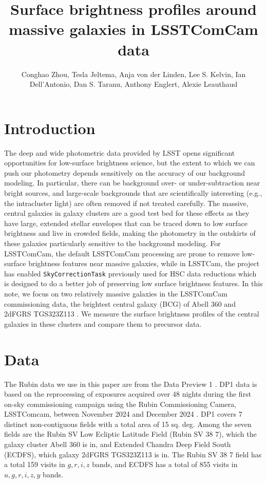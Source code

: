 \documentclass[SE, authoryear,toc]{lsstdoc}
\title{Surface brightness profiles around massive galaxies in LSSTComCam data}
\date{\vcsDate}
\begin{document}
\author{Conghao Zhou, Tesla Jeltema, Anja von der Linden, Lee S. Kelvin, Ian Dell’Antonio, Dan S. Taranu, Anthony Englert, Alexie Leauthaud}

\maketitle


\section{Introduction}
The deep and wide photometric data provided by LSST opens significant opportunities for low-surface brightness science, but the extent to which we can push our photometry depends sensitively on the accuracy of our background modeling. In particular, there can be background over- or under-subtraction near bright sources, and large-scale backgrounds that are scientifically interesting (e.g., the intracluster light) are often removed if not treated carefully. The massive, central galaxies in galaxy clusters are a good test bed for these effects as they have large, extended stellar envelopes that can be traced down to low surface brightness and live in crowded fields, making the photometry in the outskirts of these galaxies particularly sensitive to the background modeling. For LSSTComCam, the default LSSTComCam processing are prone to remove low-surface brightness features near massive galaxies, while in LSSTCam, the project has enabled \texttt{SkyCorrectionTask}  previously used for HSC data reductions which is designed to do a better job of preserving low surface brightness features. In this note, we focus on two relatively massive galaxies in the LSSTComCam commissioning data, the brightest central galaxy (BCG) of Abell 360 and 2dFGRS TGS323Z113 . We measure the surface brightness profiles of the central galaxies in these clusters and compare them to precursor data.

\section{Data}
The Rubin data we use in this paper are from the Data Preview 1 \citep[DP1;][]{RTN-095}. DP1 data is based on the reprocessing of exposures acquired over 48 nights during the first on-sky commissioning campaign using the Rubin Commissioning Camera, LSSTComcam, between November 2024 and December 2024 \citep{10.71929/RUBIN/2561361}. DP1 covers 7 distinct non-contiguous fields with a total area of 15 sq. deg. Among the seven fields are the Rubin SV Low Ecliptic Latitude Field (Rubin SV 38 7), which the galaxy cluster Abell 360 is in, and Extended Chandra Deep Field South (ECDFS), which galaxy 2dFGRS TGS323Z113 is in. The Rubin SV 38 7 field has a total 159 visits in $g, r, i, z$ bands, and ECDFS has a total of 855 visits in $u,g,r,i,z,y$ bands.
\end{document}
